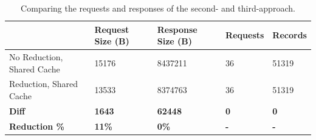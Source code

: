 \ifshowTables
\begin{table}[H]
    \begin{tabular}{|l|l|l|l|l|}
    \hline
      & Request Size (B) & Response Size (B) & Requests & Records \\
    \hline
     No Reduction, Shared Cache & 15176 &  8437211 & 36 & 51319 \\
     \hline
     Reduction, Shared Cache &  13533 &  8374763 & 36 & 51319 \\
     \hline
     \hline
     \textbf{Diff} & \textbf{1643} & \textbf{62448} & \textbf{0} & \textbf{0} \\
     \hline
     \textbf{Reduction \%} & \textbf{11\%} & \textbf{0\%} & \textbf{-} & \textbf{-} \\
     \hline
    \end{tabular}
    \caption{Comparing the requests and responses of the second- and third-approach.}
    \label{table:results:size-comparison-first-path-cache-no-reduction-cache-reduction}
\end{table}
\fi



